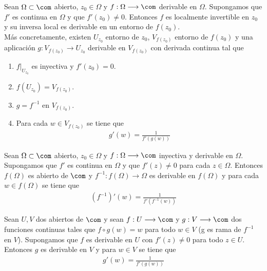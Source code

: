 \begin{teo}
Sean $\Omega \subset \com$ abierto, $z_0 \in \Omega$ y $f: \Omega \longrightarrow \com$ derivable en $\Omega$. Supongamos que $f'$ es continua en $\Omega$ y que $f'(z_0) \not = 0$. Entonces $f$ es localmente invertible en $z_0$ y su inversa local es derivable en un entorno de $f(z_0)$.
\\
\newline
Más concretamente, existen $U_{z_0}$ entorno de $z_0$, $V_{f(z_0)}$ entorno de $f(z_0)$ y una aplicación $g : V_{f(z_0)} \longrightarrow U_{z_0}$ derivable en $V_{f(z_0)}$ con derivada continua tal que
\begin{enumerate}
    \item $f|_{U_{z_0}}$ es inyectiva y $f'(z_0) = 0$.
    \item $f(U_{z_0}) = V_{f(z_0)}$.
    \item $g = f^{-1}$ en $V_{f(z_0)}$.
    \item Para cada $w \in V_{f(z_0)}$ se tiene que
    \begin{align*}
        g'(w) = \frac{1}{f'(g(w))}
    \end{align*}
\end{enumerate}
\end{teo}
\begin{teo}
Sean $\Omega \subset \com$ abierto, $z_0 \in \Omega$ y $f: \Omega \longrightarrow \com$ inyectiva y derivable en $\Omega$. Supongamos que $f'$ es continua en $\Omega$ y que $f'(z) \not = 0$ para cada $z \in \Omega$. Entonces $f(\Omega)$ es abierto de $\com$ y $f^{-1} : f(\Omega) \longrightarrow \Omega$ es derivable en $f(\Omega)$ y para cada $w \in f(\Omega)$ se tiene que
\begin{align*}
    \left(f^{-1}\right)'(w) = \frac{1}{f'\left(f^{-1}(w)\right)}
\end{align*}
\end{teo}

\begin{teo}
Sean $U,V$ dos abiertos de $\com$ y sean $f: U \longrightarrow \com$ y $g: V \longrightarrow \com$ dos funciones continuas tales que $f \circ g (w) = w$ para todo $w \in V$ (g es rama de $f^{-1}$ en $V$). Supongamos que $f$ es derivable en $U$ con $f'(z) \not = 0$ para todo $z \in U$. Entonces $g$ es derivable en $V$ y para $w \in V$ se tiene que
\begin{align*}
    g'(w) = \frac{1}{f'(g(w))}
\end{align*}
\end{teo}

